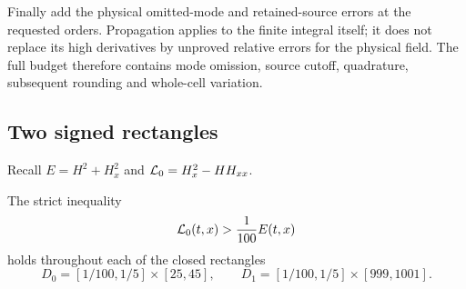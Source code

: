 Finally add the physical omitted-mode and retained-source errors at
the requested orders. Propagation applies to the finite integral itself;
it does not replace its high derivatives by unproved relative errors
for the physical field. The full budget therefore contains mode omission,
source cutoff, quadrature, subsequent rounding and whole-cell variation.

\subsection{Two signed rectangles}

Recall $E=H^2+H_x^2$ and $\mathcal L_0=H_x^2-HH_{xx}$.
\begin{proposition}\label{prop:finite-signed}
The strict inequality
\begin{equation}\label{eq:finite-signed}
 \mathcal L_0(t,x)>\frac1{100}E(t,x)
\end{equation}
holds throughout each of the closed rectangles
\[
 D_0=[1/100,1/5]\times[25,45],\qquad
 D_1=[1/100,1/5]\times[999,1001].
\]
\end{proposition}

